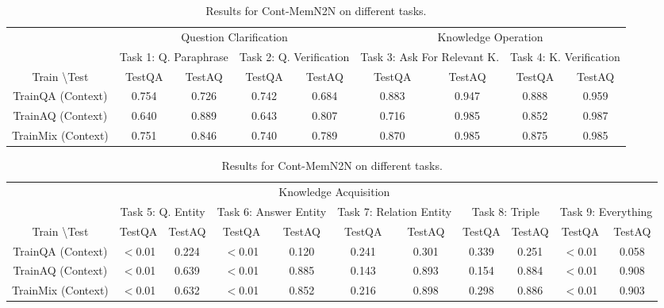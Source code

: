 \begin{table}[t!]
\centering
\scriptsize
\begin{tabular}{ccccccccc}\toprule
&\multicolumn{4}{c}{Question Clarification }&\multicolumn{4}{c}{Knowledge Operation} \\\cmidrule(r){2-5}\cmidrule(r){6-9}
&\multicolumn{2}{c}{Task 1: Q. Paraphrase}&\multicolumn{2}{c}{Task 2: Q. Verification}&\multicolumn{2}{c}{Task 3: Ask For Relevant K.}&\multicolumn{2}{c}{Task 4: K. Verification}  \\
\cmidrule(r){2-3}\cmidrule(r){4-5}\cmidrule(r){6-7}\cmidrule(r){8-9}
Train \textbackslash Test &TestQA&TestAQ &TestQA&TestAQ &TestQA&TestAQ &TestQA&TestAQ\\\midrule
TrainQA (Context) &0.754 &0.726 & 0.742&0.684&  0.883&0.947 &  0.888&0.959\\
TrainAQ (Context)&0.640&0.889&0.643&0.807&0.716&0.985 &0.852&0.987 \\
TrainMix (Context)&0.751&0.846&0.740&0.789&0.870&0.985 & 0.875&0.985 \\\bottomrule
\end{tabular}
\hspace{0.5cm}
\begin{tabular}{ccccccccccc}\toprule
&\multicolumn{8}{c}{Knowledge Acquisition }   \\\cmidrule(r){2-11}
&\multicolumn{2}{c}{Task 5: Q. Entity}&\multicolumn{2}{c}{Task 6: Answer Entity}   &\multicolumn{2}{c}{Task 7: Relation Entity}&\multicolumn{2}{c}{Task 8: Triple}&\multicolumn{2}{c}{Task 9: Everything}   \\
\cmidrule(r){2-3}\cmidrule(r){4-5}\cmidrule(r){6-7}\cmidrule(r){8-9}\cmidrule(r){10-11}
Train \textbackslash Test &TestQA&TestAQ &TestQA&TestAQ &TestQA&TestAQ &TestQA&TestAQ&TestQA&TestAQ \\\midrule
TrainQA (Context)&$<$0.01 &0.224&$<$0.01&0.120&0.241&0.301& 0.339 &0.251 & $<$0.01&0.058\\
TrainAQ (Context)& $<$0.01 &0.639& $<$0.01&0.885&0.143&0.893&0.154&0.884 &  $<$0.01&0.908\\
TrainMix (Context)& $<$0.01 &0.632&$<$0.01& 0.852 &0.216&0.898&0.298&0.886&  $<$0.01&0.903\\\bottomrule
\end{tabular}
\caption{Results for Cont-MemN2N on different tasks.}
\label{HeyHeyOOVResult}
\end{table}

